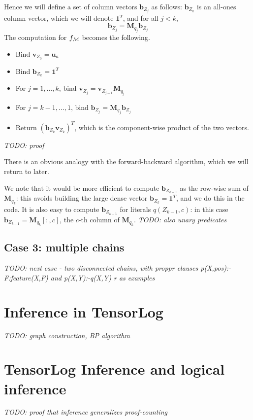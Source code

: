 \documentclass[12pt]{article}
\newcommand{\yy}[1]{\textit{TODO: {#1}}}
\newcommand{\vek}[1]{\textbf{#1}}
\newcommand{\M}{\textbf{M}}
\begin{document}
Hence we will define a set of column vectors $\vek{b}_{Z_j}$ as
follows: $\vek{b}_{Z_k}$ is an all-ones column vector, which we
will denote $\vek{1}^T$, and for all
$j<k$, 
\[ \vek{b}_{Z_j} = \M_{q_j} \vek{b}_{Z_j}
\]
The computation for $f_{\cal M}$ becomes the following.
\begin{itemize}
\item Bind $\vek{v}_{Z_0} = \vek{u}_a$
\item Bind $\vek{b}_{Z_k} = \vek{1}^T$ 
\item For $j=1,\ldots,k$, bind $\vek{v}_{Z_j} = \vek{v}_{Z_{j-1}} \M_{q_j}$
\item For $j=k-1,\ldots,1$, bind $\vek{b}_{Z_j} = \M_{q_j} \vek{b}_{Z_j}$
\item Return $(\vek{b}_{Z_{k}} \vek{v}_{Z_{k}})^T$, which is the
  component-wise product of the two vectors.
\end{itemize}

\yy{proof}

There is an obvious analogy with the forward-backward algorithm,
which we will return to later.

We note that it would be more efficient to compute $\vek{b}_{Z_{k-1}}$
as the row-wise sum of $\M_{q_k}$: this avoids building the large
dense vector $\vek{b}_{Z_k} = \vek{1}^T$, and we do this in the code.
It is also easy to compute $\vek{b}_{Z_{k-1}}$ for literals
$q(Z_{k-1},c)$: in this case $\vek{b}_{Z_{k-1}} = \M_{q_k}[:,c]$, the
$c$-th column of $\M_{q_k}$. \yy{also unary predicates}

\subsection{Case 3: multiple chains}

\yy{next case - two disconnected chains, with proppr clauses
  p(X,pos):-{F:feature(X,F)} and p(X,Y):-q(X,Y) {r} as examples}

\section{Inference in TensorLog}

\yy{graph construction, BP algorithm}

\section{TensorLog Inference and logical inference}

\yy{proof that inference generalizes proof-counting}
\end{document}
